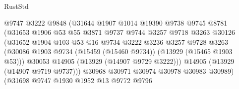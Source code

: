 \begin{lexlean}{RustStd}
\begin{coremodule}
                                    @9747
                                    @3222
                                    @9848
                                    (@31644
                                      @1907
                                      @1014
                                      @19390
                                      @9738
                                      @9745
                                      @8781
                                      (@31653
                                        @1906
                                        @53
                                        @55
                                        @3871
                                        @9737
                                        @9744
                                        @3257
                                        @9718
                                        @3263
                                        @30126
                                        (@31652
                                          @1904
                                          @103
                                          @53
                                          @16
                                          @9734
                                          @3222
                                          @3236
                                          @3257
                                          @9728
                                          @3263
                                          (@30086
                                            @1903
                                            @9734
                                            (@15459 (@15460 @9734))
                                            (@13929 (@15465 @1903 @53)))
                                          @30053
                                          @14905
                                          (@13929 (@14907 @9729 @3222)))
                                        @14905
                                        (@13929 (@14907 @9719 @9737)))
                                      @30968
                                      @30971
                                      @30974
                                      @30978
                                      @30983
                                      @30989)
                                    (@31698
                                      @9747
                                      @1930
                                      @1952
                                      @13
                                      @9772
                                      @9796

\end{coremodule}
\end{lexlean}
